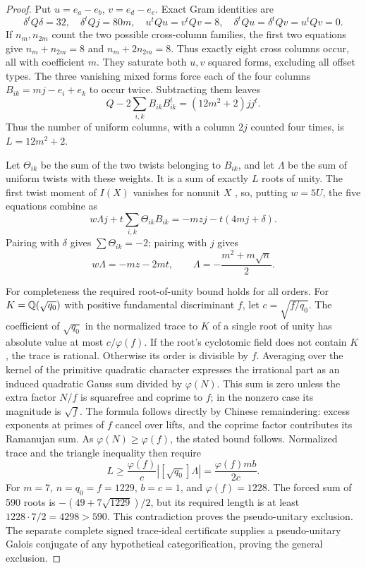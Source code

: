 \begin{proof}
Put $u=e_a-e_b$, $v=e_d-e_e$.  Exact Gram identities are
\[
 \delta^tQ\delta=32,\quad\delta^tQj=80m,\quad
 u^tQu=v^tQv=8,\quad
 \delta^tQu=\delta^tQv=u^tQv=0.
\]
If $n_m,n_{2m}$ count the two possible cross-column families, the first
two equations give $n_m+n_{2m}=8$ and $n_m+2n_{2m}=8$.
Thus exactly eight cross columns occur, all with coefficient $m$.
They saturate both $u,v$ squared forms, excluding all offset types.
The three vanishing mixed forms force each of the four columns
$B_{ik}=mj-e_i+e_k$ to occur twice.  Subtracting them leaves
\[
 Q-2\sum_{i,k}B_{ik}B_{ik}^t=(12m^2+2)jj^t.
\]
Thus the number of uniform columns, with a column $2j$ counted four
times, is $L=12m^2+2$.

Let $\Theta_{ik}$ be the sum of the two twists belonging to $B_{ik}$,
and let $\Lambda$ be the sum of uniform twists with these weights.
It is a sum of exactly $L$ roots of unity.  The first twist moment of
$I(X)$ vanishes for nonunit $X$ \cite[Theorem 2.5]{Ostrik3}, so, putting
$w=5U$, the five equations combine as
\[
 w\Lambda j+t\sum_{i,k}\Theta_{ik}B_{ik}
 =-mzj-t(4mj+\delta).
\]
Pairing with $\delta$ gives $\sum\Theta_{ik}=-2$; pairing with $j$ gives
\[
 w\Lambda=-mz-2mt,\qquad
 \Lambda=-\frac{m^2+m\sqrt n}{2}.
\]

For completeness the required root-of-unity bound holds for all orders.
For $K=\mathbb Q(\sqrt{q_0})$ with positive fundamental discriminant $f$, let
$c=\sqrt{f/q_0}$.  The coefficient of $\sqrt{q_0}$ in the normalized trace
to $K$ of a single root of unity has absolute value at most
$c/\varphi(f)$.  If the root's cyclotomic field does not contain $K$,
the trace is rational.  Otherwise its order is divisible by $f$.
Averaging over the kernel of the primitive quadratic character expresses
the irrational part as an induced quadratic Gauss sum divided by
$\varphi(N)$.  This sum is zero unless the extra factor $N/f$ is squarefree
and coprime to $f$; in the nonzero case its magnitude is $\sqrt f$.
The formula follows directly by Chinese remaindering: excess exponents
at primes of $f$ cancel over lifts, and the coprime factor contributes its
Ramanujan sum.  As $\varphi(N)\ge\varphi(f)$, the stated bound follows.
Normalized trace and the triangle inequality then require
\[
 L\ge\frac{\varphi(f)}c\left|[\sqrt{q_0}]\Lambda\right|
   =\frac{\varphi(f)mb}{2c}.
\]
For $m=7$, $n=q_0=f=1229$, $b=c=1$, and $\varphi(f)=1228$.
The forced sum of 590 roots is $-(49+7\sqrt{1229})/2$, but its required
length is at least $1228\cdot7/2=4298>590$.  This contradiction proves the
pseudo-unitary exclusion.  The separate complete signed trace-ideal
certificate supplies a pseudo-unitary Galois conjugate of any hypothetical
categorification, proving the general exclusion.
\end{proof}

